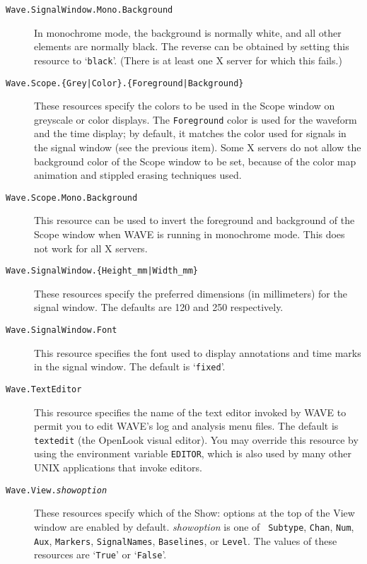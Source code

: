 \documentclass[twoside]{book}
\newcommand{\WAVE}{{\sf WAVE}\xspace}
\begin{document}
\begin{description}
\item[{\tt Wave.SignalWindow.Mono.Background}]
In monochrome mode, the background is normally white, and all other
elements are normally black.  The reverse can be obtained by setting this
resource to `{\tt black}'.  (There is at least one X server for which this
fails.)

\item[{\tt Wave.Scope.\{Grey|Color\}.\{Foreground|Background\}}]

These resources specify the colors to be used in the {\sf Scope}
window on greyscale or color displays.  The {\tt Foreground} color is
used for the waveform and the time display; by default, it matches the
color used for signals in the signal window (see the previous item).
Some X servers do not allow the background color of the {\sf Scope}
window to be set, because of the color map animation and stippled
erasing techniques used.

\item[{\tt Wave.Scope.Mono.Background}]
This resource can be used to invert the foreground and background of
the {\sf Scope} window when \WAVE{} is running in monochrome mode.
This does not work for all X servers.

\item[{\tt Wave.SignalWindow.\{Height\_mm|Width\_mm\}}]
These resources specify the preferred dimensions (in millimeters) for the
signal window.  The defaults are 120 and 250 respectively.

\item[{\tt Wave.SignalWindow.Font}]
This resource specifies the font used to display annotations and time marks in
the signal window.  The default is `{\tt fixed}'.

\item[{\tt Wave.TextEditor}]
This resource specifies the name of the text editor invoked by \WAVE{} to
permit you to edit \WAVE{}'s log and analysis menu files.  The default is
{\tt textedit} (the OpenLook visual editor).  You may override this resource
by using the environment variable {\tt EDITOR}, which is also used by many
other UNIX applications that invoke editors.

\item[{\tt Wave.View.{\it showoption}}]
These resources specify which of the {\sf Show:} options at the top of the
{\sf View} window are enabled by default.  {\it showoption} is one of {\tt
Subtype}, {\tt Chan}, {\tt Num}, {\tt Aux}, {\tt Markers}, {\tt SignalNames},
{\tt Baselines}, or {\tt Level}.  The values of these
resources are `{\tt True}' or `{\tt False}'.


\end{description}
\end{document}
